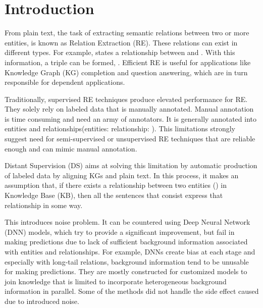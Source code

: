 \chapter{Introduction}
\label{ch:introduction}

\newpar
From plain text, the task of extracting semantic relations between two or more entities, is known as Relation Extraction (RE). These relations can exist in different types. For example,  states a  relationship between  and . With this information, a triple can be formed, . Efficient RE is useful for applications like Knowledge Graph (KG) completion and question answering, which are in turn responsible for dependent applications. 


\newpar
Traditionally, supervised RE techniques produce elevated performance for RE\cite{bibid}. They solely rely on labeled data that is manually annotated. Manual annotation is time consuming and need an army of annotators. It is generally annotated into entities and relationships(entities:  relationship: ). This limitations strongly suggest need for semi-supervised or unsupervised RE techniques that are reliable enough and can mimic manual annotation. 

\newpar
Distant Supervision (DS) aims at solving this limitation by automatic production of labeled data by aligning KGs and plain text. In this process, it makes an assumption that, if there exists a relationship between two entities () in Knowledge Base (KB), then all the sentences that consist  express that relationship in some way\cite{zeng2015distant}. 

This introduces noise problem. It can be countered using Deep Neural Network (DNN) models, which try to provide a significant improvement, but fail in making predictions due to lack of sufficient background information associated with entities and relationships. For example, %
DNNs create bias at each stage and especially with long-tail relations, background information tend to be unusable for making predictions. They are mostly constructed for customized models to join knowledge that is limited to incorporate heterogeneous background information in parallel. Some of the methods did not handle the side effect caused due to introduced noise. 


